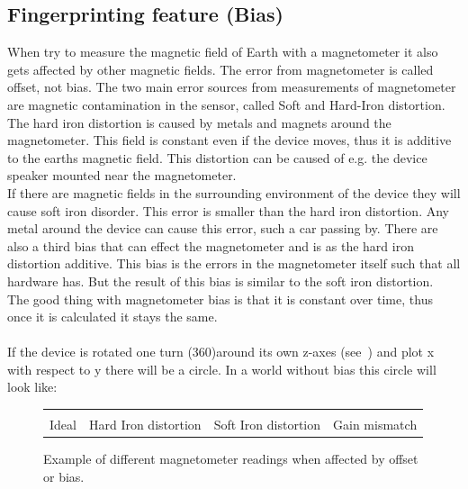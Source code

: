 \subsection{Fingerprinting feature (Bias)}
When try to measure the magnetic field of Earth with a magnetometer it also gets affected by other magnetic fields. The error from magnetometer is called offset, not bias. The two main error sources from measurements of magnetometer are magnetic contamination in the sensor, called Soft and Hard-Iron distortion. \\
The hard iron distortion is caused by metals and magnets around the magnetometer. This field is constant even if the device moves, thus it is additive to the earths magnetic field. This distortion can be caused of e.g. the device speaker mounted near the magnetometer. \\
If there are magnetic fields in the surrounding environment of the device they will cause soft iron disorder. This error is smaller than the hard iron distortion. Any metal around the device can cause this error, such a car passing by.
There are also a third bias that can effect the magnetometer and is as the hard iron distortion additive. This bias is the errors in the magnetometer itself such that all hardware has. But the result of this bias is similar to the soft iron distortion.  \\
The good thing with magnetometer bias is that it is constant over time, thus once it is calculated it stays the same. \\
\\
If the device is rotated one turn (360\degree)around its own z-axes (see~) and plot x with respect to y there will be a circle. In a world without bias this circle will look like:
\begin{figure}[H]
\begin{tabular}{p{} p{} p{} p{}}
        \vspace{0pt}  & 
        \vspace{0pt}  & 
        \vspace{0pt}  & 
        \vspace{0pt}  \\
        \vspace{0pt} Ideal & Hard Iron distortion & Soft Iron distortion & Gain mismatch \\
\end{tabular}
\caption{Example of different magnetometer readings when affected by offset or bias.}\label{fig:magnCircle}
\end{figure}
\cite[]{liu:magnAcc}

